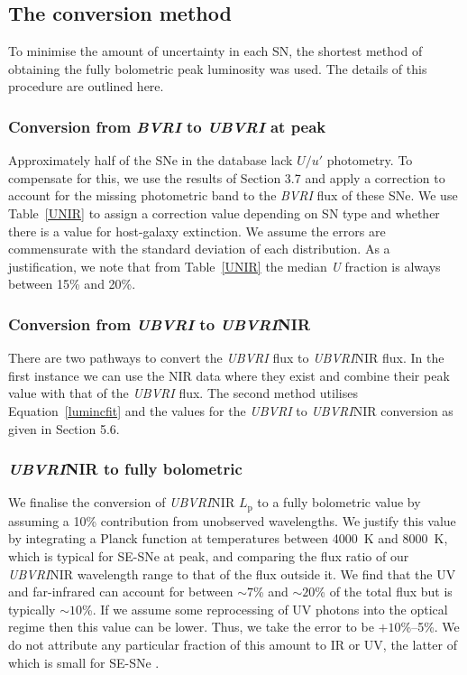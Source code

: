 \documentclass[a4paper,fleqn,usenatbib]{mnras}
\begin{document}
\subsection{The conversion method}

To minimise the amount of uncertainty in each SN, the shortest method of obtaining the fully bolometric peak luminosity was used. The details of this procedure are outlined here.
\subsubsection{Conversion from \textit{BVRI} to \textit{UBVRI} at peak}
Approximately half of the SNe in the database lack $U/u'$ photometry. To compensate for this, we use the results of Section 3.7 and apply a correction to account for the missing photometric band to the \textit{BVRI} flux of these SNe. We use Table~\ref{UNIR} to assign a correction value depending on SN type and whether there is a value for host-galaxy extinction. We assume the errors are commensurate with the standard deviation of each distribution. As a justification, we note that from Table~\ref{UNIR} the median \textit{U} fraction is always between 15\% and 20\%.
\subsubsection{Conversion from \textit{UBVRI} to \textit{UBVRI}NIR}
There are two pathways to convert the \textit{UBVRI} flux to \textit{UBVRI}NIR flux. In the first instance we can use the NIR data where they exist and combine their peak value with that of the \textit{UBVRI} flux. The second method utilises Equation~\ref{lumincfit} and the values for the \textit{UBVRI} to \textit{UBVRI}NIR conversion as given in Section 5.6.

\subsubsection{\textit{UBVRI}NIR to fully bolometric}
We finalise the conversion of \textit{UBVRI}NIR $L_{\mathrm{p}}$ to a fully bolometric value by assuming a 10\% contribution from unobserved wavelengths. We justify this value by integrating a Planck function at temperatures between 4000~K and 8000~K, which is typical for SE-SNe at peak, and comparing the flux ratio of our {\it UBVRI}NIR wavelength range to that of the flux outside it. We find that the UV and far-infrared can account for between $\sim 7$\% and $\sim 20$\% of the total flux but is typically $\sim 10$\%. If we assume some reprocessing of UV photons into the optical regime then this value can be lower. Thus, we take the error to be $+10$\%--5\%. We do not attribute any particular fraction of this amount to IR or UV, the latter of which is small for SE-SNe \citep{Pritchard2014}.
\end{document}
